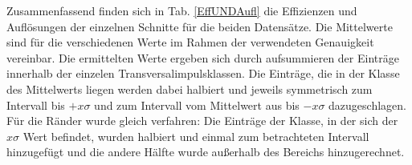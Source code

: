 %
%
%
%
%
%
Zusammenfassend finden sich in Tab. \ref{EffUNDAufl} die Effizienzen und Auflösungen der einzelnen Schnitte für die beiden Datensätze. Die Mittelwerte sind für die verschiedenen Werte im Rahmen der verwendeten Genauigkeit vereinbar. Die ermittelten Werte ergeben sich durch aufsummieren der Einträge innerhalb der einzelen Transversalimpulsklassen. Die Einträge, die in der Klasse des Mittelwerts liegen werden dabei halbiert und jeweils symmetrisch zum Intervall bis $+x\sigma$ und zum Intervall vom Mittelwert aus bis $-x\sigma$ dazugeschlagen. Für die Ränder wurde gleich verfahren: Die Einträge der Klasse, in der sich der $x\sigma$ Wert befindet, wurden halbiert und einmal zum betrachteten Intervall hinzugefügt und die andere Hälfte wurde außerhalb des Bereichs hinzugerechnet.
